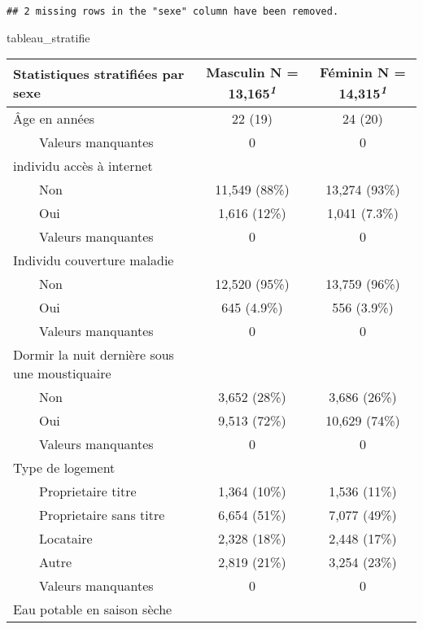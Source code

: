 \documentclass[
]{article}
\newenvironment{Shaded}{\begin{snugshade}}{\end{snugshade}}
\newcommand{\NormalTok}[1]{#1}
\begin{document}
\begin{verbatim}
## 2 missing rows in the "sexe" column have been removed.
\end{verbatim}

\begin{Shaded}
\begin{Highlighting}[]
\NormalTok{tableau\_stratifie}
\end{Highlighting}
\end{Shaded}

\begin{table}[!t]
\fontsize{12.0pt}{14.4pt}\selectfont
\begin{tabular*}{\linewidth}{@{\extracolsep{\fill}}lcc}
\toprule
Statistiques stratifiées par sexe & \textbf{Masculin}  N = 13,165\textsuperscript{\textit{1}} & \textbf{Féminin}  N = 14,315\textsuperscript{\textit{1}} \\ 
\midrule\addlinespace[2.5pt]
Âge en années & 22 (19) & 24 (20) \\ 
    Valeurs manquantes & 0 & 0 \\ 
individu accès à internet &  &  \\ 
    Non & 11,549 (88\%) & 13,274 (93\%) \\ 
    Oui & 1,616 (12\%) & 1,041 (7.3\%) \\ 
    Valeurs manquantes & 0 & 0 \\ 
Individu couverture maladie &  &  \\ 
    Non & 12,520 (95\%) & 13,759 (96\%) \\ 
    Oui & 645 (4.9\%) & 556 (3.9\%) \\ 
    Valeurs manquantes & 0 & 0 \\ 
Dormir la nuit dernière sous une moustiquaire &  &  \\ 
    Non & 3,652 (28\%) & 3,686 (26\%) \\ 
    Oui & 9,513 (72\%) & 10,629 (74\%) \\ 
    Valeurs manquantes & 0 & 0 \\ 
Type de logement &  &  \\ 
    Proprietaire titre & 1,364 (10\%) & 1,536 (11\%) \\ 
    Proprietaire sans titre & 6,654 (51\%) & 7,077 (49\%) \\ 
    Locataire & 2,328 (18\%) & 2,448 (17\%) \\ 
    Autre & 2,819 (21\%) & 3,254 (23\%) \\ 
    Valeurs manquantes & 0 & 0 \\ 
Eau potable en saison sèche &  &  \\ 

\end{tabular*}
\end{table}
\end{document}
